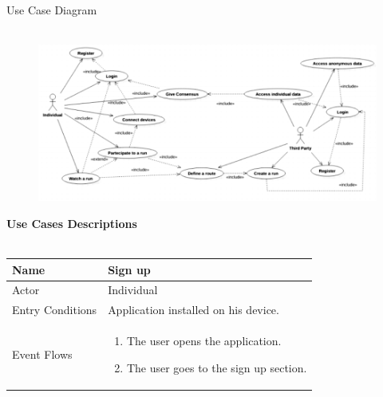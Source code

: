 \documentclass{article}
\begin{document}
\begin{legal}
\begin{legal}
\begin{legal}
{\begin{legal}
		\end{legal}
		}
    		\item Use Case Diagram\\\\
    			\begin{figure}[H]
			  	\includegraphics[width=\linewidth]{./images/usecase.png}
				\end{figure}
				\item \textbf{Use Cases Descriptions}\\\\
				\begin{tabular}{| m{3.5cm} | m{8cm}| }
				\hline
					Name & Sign up\\
				\hline
					Actor & Individual\\
				\hline
					Entry Conditions & Application installed
				on his device.\\
				\hline
					Event Flows & \begin{enumerate}
									\item The user opens the application.
									\item The user goes to the sign up section.
									

\end{enumerate}
\end{tabular}
\end{legal}
\end{legal}
\end{legal}
\end{document}
